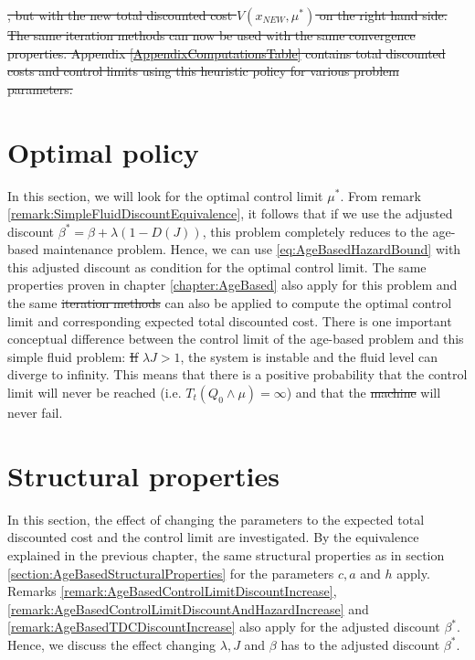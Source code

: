 \documentclass[a4paper]{thesis}
\theoremstyle{definition}
\providecommand{\DIFaddtex}[1]{{\protect\color{blue}\uwave{#1}}} %
\providecommand{\DIFdeltex}[1]{{\protect\color{red}\sout{#1}}}                      %
\providecommand{\DIFaddbegin}{} %
\providecommand{\DIFaddend}{} %
\providecommand{\DIFdelbegin}{} %
\providecommand{\DIFdelend}{} %
\providecommand{\DIFadd}[1]{\texorpdfstring{\DIFaddtex{#1}}{#1}} %
\providecommand{\DIFdel}[1]{\texorpdfstring{\DIFdeltex{#1}}{}} %
\newcommand{\DIFscaledelfig}{0.5}
\newlength{\DIFdelgraphicswidth} %
\newlength{\DIFdelgraphicsheight} %
\newcommand{\DIFaddincludegraphics}[2][]{{\color{blue}\fbox{\DIFOincludegraphics[#1]{#2}}}} %
\newcommand{\DIFdelincludegraphics}[2][]{%
	\sbox{\DIFdelgraphicsbox}{\DIFOincludegraphics[#1]{#2}}%
	\settoboxwidth{\DIFdelgraphicswidth}{\DIFdelgraphicsbox} %
	\settoboxtotalheight{\DIFdelgraphicsheight}{\DIFdelgraphicsbox} %
	\scalebox{\DIFscaledelfig}{%
		\parbox[b]{\DIFdelgraphicswidth}{\usebox{\DIFdelgraphicsbox}\\[-\baselineskip] \rule{\DIFdelgraphicswidth}{0em}}\llap{\resizebox{\DIFdelgraphicswidth}{\DIFdelgraphicsheight}{%
				\setlength{\unitlength}{\DIFdelgraphicswidth}%
				\begin{picture}(1,1)%
				\thicklines\linethickness{2pt} %
				{\color[rgb]{1,0,0}\put(0,0){\framebox(1,1){}}}%
				{\color[rgb]{1,0,0}\put(0,0){\line( 1,1){1}}}%
				{\color[rgb]{1,0,0}\put(0,1){\line(1,-1){1}}}%
				\end{picture}%
			}\hspace*{3pt}}} %
} %
\DeclareRobustCommand{\DIFaddbegin}{\DIFOaddbegin \let\includegraphics\DIFaddincludegraphics} %
\DeclareRobustCommand{\DIFaddend}{\DIFOaddend \let\includegraphics\DIFOincludegraphics} %
\DeclareRobustCommand{\DIFdelbegin}{\DIFOdelbegin \let\includegraphics\DIFdelincludegraphics} %
\DeclareRobustCommand{\DIFdelend}{\DIFOaddend \let\includegraphics\DIFOincludegraphics} %
\begin{document}
	\DIFdel{, but with the new total discounted cost $V(x_{NEW},\mu^*)$ on the right hand side.
		The same iteration methods can now be used with the same convergence properties.
		Appendix \ref{AppendixComputationsTable} contains total discounted costs and control limits using this heuristic policy for various problem parameters. }\DIFdelend \section{Optimal policy}
	In this section, we will look for the optimal control limit $\mu^*$.
	From remark \ref{remark:SimpleFluidDiscountEquivalence}, it follows that if we use the adjusted discount $\beta^*=\beta+\lambda(1-D(J))$, this problem completely reduces to the age-based maintenance problem.
	Hence, we can use \eqref{eq:AgeBasedHazardBound} with this adjusted discount as condition for the optimal control limit.
	The same properties proven in chapter \ref{chapter:AgeBased} also apply for this problem and the same \DIFdelbegin \DIFdel{iteration methods }\DIFdelend \DIFaddbegin \DIFadd{policy iteration }\DIFaddend can also be applied to compute the optimal control limit and corresponding expected total discounted cost.
	There is one important conceptual difference between the control limit of the age-based problem and this simple fluid problem:
	\DIFdelbegin \DIFdel{If }\DIFdelend \DIFaddbegin \DIFadd{if }\DIFaddend $\lambda J>1$, the system is instable and the fluid level can diverge to infinity.
	This means that there is a positive probability that the control limit will never be reached (i.e. $T_t(Q_0\wedge\mu)=\infty$) and that the \DIFdelbegin \DIFdel{machine }\DIFdelend \DIFaddbegin \DIFadd{asset }\DIFaddend will never fail. \section{Structural properties}\DIFaddbegin \label{section:SimpleStructuralProperties}
	\DIFaddend In this section, the effect of changing the parameters to the expected total discounted cost and the control limit are investigated.
	By the equivalence explained in the previous chapter, the same structural properties as in section \ref{section:AgeBasedStructuralProperties} for the parameters $c,a$ and $h$ apply.
	Remarks \ref{remark:AgeBasedControlLimitDiscountIncrease}, \ref{remark:AgeBasedControlLimitDiscountAndHazardIncrease} and \ref{remark:AgeBasedTDCDiscountIncrease} also apply for the adjusted discount $\beta^*$.
	Hence, we discuss the effect changing $\lambda,J$ and $\beta$ has to the adjusted discount $\beta^*$.
\end{document}
